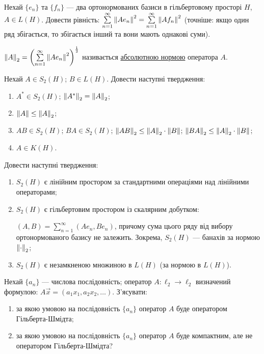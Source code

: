 
\begin{exercise}
    Нехай $\{e_n\}$ та $\{f_n\}$ --- два ортонормованих базиси в гільбертовому просторі $H$, 
    $A \in L(H)$. Довести рівність: 
    $\sum\limits_{n = 1}^\infty \left\lVert A e_n\right\rVert^2 = \sum\limits_{n = 1}^\infty \left\lVert A f_n\right\rVert^2$ (точніше: якщо
    один ряд збігається, то збігається інший та вони мають однакові суми).
\end{exercise}

\begin{theory}
    $\left\lVert A\right\rVert_2 = \left(\sum\limits_{n = 1}^\infty \left\lVert A e_n\right\rVert^2\right)^{\frac{1}{2}}$ називається
    \underline{абсолютною нормою} оператора $A$.
\end{theory}

\begin{exercise}
    Нехай $A \in S_2 (H)$; $B \in L(H)$. Довести наступні твердження:
    \begin{enumerate}
        \item $A^* \in S_2 (H)$; $\left\lVert A^*\right\rVert_2 = \left\lVert A\right\rVert_2$;
        \item $\left\lVert A\right\rVert \leq \left\lVert A\right\rVert_2$;
        \item $AB \in S_2 (H)$; $BA \in S_2 (H)$; $\left\lVert AB\right\rVert_2 \leq \left\lVert A\right\rVert_2 \cdot \left\lVert B\right\rVert$; 
        $\left\lVert BA\right\rVert_2 \leq \left\lVert A\right\rVert_2 \cdot \left\lVert B\right\rVert$;
        \item $A \in K(H)$.
    \end{enumerate}
\end{exercise}

\begin{exercise}
    Довести наступні твердження:
    \begin{enumerate}
        \item $S_2(H)$ є лінійним простором за стандартними операціями над лінійними операторами; 
        \item $S_2(H)$ є гільбертовим простором із скалярним добутком:
         
        $(A, B) = \sum\limits_{n = 1}^\infty \left(A e_n, B e_n\right)$, причому сума цього ряду від вибору
        ортонормованого базису не залежить. Зокрема, $S_2(H)$ --- банахів за нормою $\left\lVert\cdot\right\rVert_2$;
        \item $S_2(H)$ є незамкненою множиною в $L(H)$ (за нормою в $L(H)$).
    \end{enumerate}
\end{exercise}

\begin{exercise}\label{N:1_5_42}
    Нехай $\{a_n\}$ --- числова послідовність; оператор $A:\ell_2 \rightarrow \ell_2$ визначений формулою:
    $A \vec{x} = \left(a_1 x_1, a_2 x_2, \dots \right)$. З'ясувати:
    \begin{enumerate}
        \item за якою умовою на послідовність $\{a_n\}$ оператор $A$ буде оператором Гільберта-Шмідта;
        \item за якою умовою на послідовність $\{a_n\}$ оператор $A$ буде компактним, але не оператором Гільберта-Шмідта?
    \end{enumerate}
\end{exercise}

